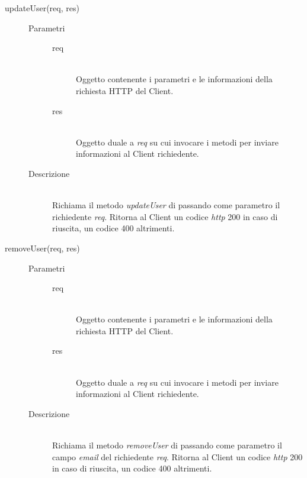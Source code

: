 \begin{description}
\begin{description}
    \item[updateUser(req, res)] \hfill
    \begin{description}
	\item[Parametri] \hfill
	  \begin{description}
	    \item[req] \hfill \\
	    Oggetto contenente i parametri e le informazioni della richiesta HTTP del Client.
	    \item[res] \hfill \\
	    Oggetto duale a \textit{req} su cui invocare i metodi per inviare informazioni al Client richiedente.
	  \end{description}
	\item[Descrizione] \hfill \\
	Richiama il metodo \textit{updateUser} di  passando come parametro il richiedente \textit{req}. Ritorna al Client un codice \textit{http} 200 in caso di riuscita, un codice 400 altrimenti.

      \end{description}
      
    \item[removeUser(req, res)] \hfill
    \begin{description}
	\item[Parametri] \hfill
	  \begin{description}
	    \item[req] \hfill \\
	    Oggetto contenente i parametri e le informazioni della richiesta HTTP del Client.
	    \item[res] \hfill \\
	    Oggetto duale a \textit{req} su cui invocare i metodi per inviare informazioni al Client richiedente.
	  \end{description}
	\item[Descrizione] \hfill \\
	Richiama il metodo \textit{removeUser} di  passando come parametro il campo \textit{email} del richiedente \textit{req}. Ritorna al Client un codice \textit{http} 200 in caso di riuscita, un codice 400 altrimenti.
      \end{description}
      
 \end{description}
 
\end{description}


